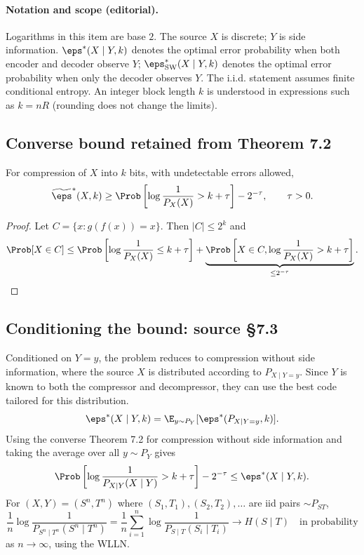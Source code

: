 
\paragraph{Notation and scope (editorial).}
Logarithms in this item are base $2$. The source $X$ is discrete; $Y$ is side information. $\eps^*(X\mid Y,k)$ denotes the optimal error probability when both encoder and decoder observe $Y$; $\eps^*_{\rm SW}(X\mid Y,k)$ denotes the optimal error probability when only the decoder observes $Y$. The i.i.d. statement assumes finite conditional entropy. An integer block length $k$ is understood in expressions such as $k=nR$ (rounding does not change the limits).

\subsection*{Converse bound retained from Theorem 7.2}
\begin{theorem}[Converse, 7.2]
For compression of $X$ into $k$ bits, with undetectable errors allowed,
\[
\widetilde\eps^*(X,k)\ge
\Prob\left[\log\frac1{P_X(X)}>k+\tau\right]-2^{-\tau},\qquad\tau>0.
\]
\end{theorem}
\begin{proof}
Let $C=\{x:g(f(x))=x\}$. Then $|C|\le2^k$ and
\[
\Prob[X\in C]\le
\Prob\left[\log\frac1{P_X(X)}\le k+\tau\right]
+\underbrace{\Prob\left[X\in C,\log\frac1{P_X(X)}>k+\tau\right]}_{\le2^{-\tau}}.
\]
\end{proof}

\subsection*{Conditioning the bound: source \S7.3}
Conditioned on $Y=y$, the problem reduces to compression without side information, where the source $X$ is distributed according to $P_{X\mid Y=y}$. Since $Y$ is known to both the compressor and decompressor, they can use the best code tailored for this distribution.
\[
\eps^*(X\mid Y,k)=\E_{y\sim P_Y}[\eps^*(P_{X\mid Y=y},k)].
\]
Using the converse Theorem 7.2 for compression without side information and taking the average over all $y\sim P_Y$ gives
\[
\Prob\left[\log\frac1{P_{X\mid Y}(X\mid Y)}>k+\tau\right]-2^{-\tau}
\le\eps^*(X\mid Y,k).
\]
For $(X,Y)=(S^n,T^n)$ where $(S_1,T_1),(S_2,T_2),\ldots$ are iid pairs $\sim P_{ST}$,
\[
\frac1n\log\frac1{P_{S^n\mid T^n}(S^n\mid T^n)}
=\frac1n\sum_{i=1}^n\log\frac1{P_{S\mid T}(S_i\mid T_i)}
\longrightarrow H(S\mid T)\quad\text{in probability}
\]
as $n\to\infty$, using the WLLN.

